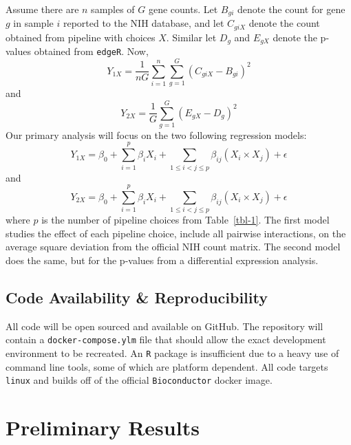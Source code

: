 \documentclass[
  letterpaper,
]{article}
\begin{document}
Assume there are \(n\) samples of \(G\) gene counts. Let \(B_{gi}\)
denote the count for gene \(g\) in sample \(i\) reported to the NIH
database, and let \(C_{giX}\) denote the count obtained from pipeline
with choices \(X\). Similar let \(D_g\) and \(E_{gX}\) denote the
p-values obtained from \texttt{edgeR}. Now,\\
\begin{equation}
    Y_{1X} = \frac{1}{nG} \sum_{i=1}^n \sum_{g=1}^G (C_{giX} - B_{gi})^2  
\end{equation} and \begin{equation} 
    Y_{2X} = \frac 1 G \sum_{g=1}^G (E_{gX} - D_g)^2  
\end{equation} Our primary analysis will focus on the two following
regression models: \begin{equation}
    Y_{1X} = \beta_0 + \sum_{i=1}^p \beta_i X_i + 
        \sum_{1\leq i < j \leq p} \beta_{ij}(X_i \times X_j) + \epsilon
\end{equation} and \begin{equation}
    Y_{2X} = \beta_0 + \sum_{i=1}^p \beta_i X_i + 
        \sum_{1\leq i < j \leq p} \beta_{ij}(X_i \times X_j) + \epsilon
\end{equation} where \(p\) is the number of pipeline choices from
Table~\ref{tbl-1}. The first model studies the effect of each pipeline
choice, include all pairwise interactions, on the average square
deviation from the official NIH count matrix. The second model does the
same, but for the p-values from a differential expression analysis.

\hypertarget{code-availability-reproducibility}{%
\subsection{Code Availability \&
Reproducibility}\label{code-availability-reproducibility}}

All code will be open sourced and available on GitHub. The repository
will contain a \texttt{docker-compose.ylm} file that should allow the
exact development environment to be recreated. An \texttt{R} package is
insufficient due to a heavy use of command line tools, some of which are
platform dependent. All code targets \texttt{linux} and builds off of
the official \texttt{Bioconductor} docker image.

\hypertarget{preliminary-results}{%
\section{Preliminary Results}\label{preliminary-results}}
\end{document}
